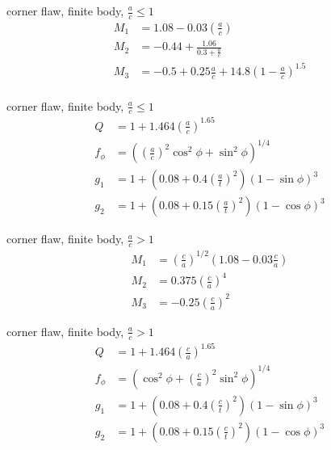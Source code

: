 \documentclass[
  letterpaper,
  ignorenonframetext,
  aspectratio=43,
  handout,
  12pt]{beamer}
\begin{document}
\begin{frame}{corner flaw, finite body, \(\frac{a}{c} \le 1\)}
\protect\hypertarget{corner-flaw-finite-body-fracac-le-1}{}
\[\begin{aligned}
  M_1 &= 1.08 - 0.03 \left(\frac{a}{c}\right)\\
  M_2 &= -0.44 + \frac{1.06}{0.3 + \frac{a}{c}}\\
  M_3 &= -0.5 + 0.25 \frac{a}{c} + 14.8 \left(1-\frac{a}{c}\right)^{1.5}\\
\end{aligned}\]
\end{frame}

\begin{frame}{corner flaw, finite body, \(\frac{a}{c} \le 1\)}
\protect\hypertarget{corner-flaw-finite-body-fracac-le-1-1}{}
\[\begin{aligned}
  Q &= 1 + 1.464\left(\frac{a}{c}\right)^{1.65}\\
  f_\phi &= \left(\left(\frac{a}{c}\right)^2 \cos^2 \phi + \sin^2 \phi \right)^{1/4}\\
  g_1 &= 1 + \left(0.08 + 0.4 \left(\frac{a}{t}\right)^2\right)\left(1-\sin \phi\right)^3\\
  g_2 &= 1 + \left(0.08 + 0.15 \left(\frac{a}{t}\right)^2\right)\left(1-\cos \phi\right)^3
\end{aligned}\]
\end{frame}

\begin{frame}{corner flaw, finite body, \(\frac{a}{c} > 1\)}
\protect\hypertarget{corner-flaw-finite-body-fracac-1}{}
\[\begin{aligned}
  M_1 &= \left(\frac{c}{a}\right)^{1/2} \left(1.08 - 0.03 \frac{c}{a}\right)\\
  M_2 &= 0.375 \left(\frac{c}{a}\right)^4\\
  M_3 &= -0.25 \left(\frac{c}{a}\right)^2
\end{aligned}\]
\end{frame}

\begin{frame}{corner flaw, finite body, \(\frac{a}{c} > 1\)}
\protect\hypertarget{corner-flaw-finite-body-fracac-1-1}{}
\[\begin{aligned}
  Q &= 1 + 1.464\left(\frac{c}{a}\right)^{1.65}\\
  f_\phi &= \left(\cos^2 \phi + \left(\frac{c}{a}\right)^2 \sin^2 \phi \right)^{1/4}\\
  g_1 &= 1 + \left(0.08 + 0.4 \left(\frac{c}{t}\right)^2\right)\left(1-\sin \phi\right)^3\\
  g_2 &= 1 + \left(0.08 + 0.15 \left(\frac{c}{t}\right)^2\right)\left(1-\cos \phi\right)^3
\end{aligned}\]
\end{frame}
\end{document}
